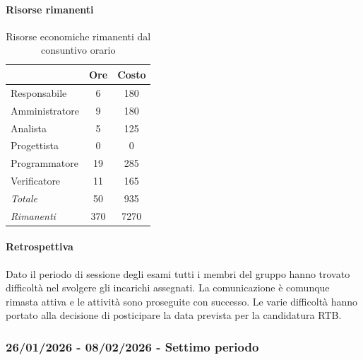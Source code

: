 \documentclass[a4paper,12pt]{article}
\begin{document}
            \paragraph{Risorse rimanenti}
                \begin{table}[H]
                \centering
                \caption{Risorse economiche rimanenti dal consuntivo orario}
                \begin{tabular}{|l|c|c|}
                \hline
                    \rowcolor{lightgray}{\textbf{Ruolo}} & {\textbf{Ore}} & {\textbf{Costo}}\\
                \hline
                    Responsabile & 6 & 180\\
                \hline
                    Amministratore & 9 & 180\\
                \hline
                    Analista & 5 & 125\\
                \hline
                    Progettista & 0 & 0\\
                \hline
                    Programmatore & 19 & 285\\
                \hline
                    Verificatore & 11 & 165\\
                \hline
                    \rowcolor{lightgray}\textit{Totale} & 50 & 935\\
                \hline
                    \rowcolor{lightgray}\textit{Rimanenti} & 370 & 7270\\
                \hline
                \end{tabular}
                \end{table}
                
            \paragraph{Retrospettiva}
            Dato il periodo di sessione degli esami tutti i membri del gruppo hanno trovato difficoltà nel svolgere gli incarichi assegnati. La comunicazione è comunque rimasta attiva e le attività sono proseguite con successo. Le varie difficoltà hanno portato alla decisione di posticipare la data prevista per la candidatura RTB.


        \subsubsection{26/01/2026 - 08/02/2026 - Settimo periodo}
\end{document}

